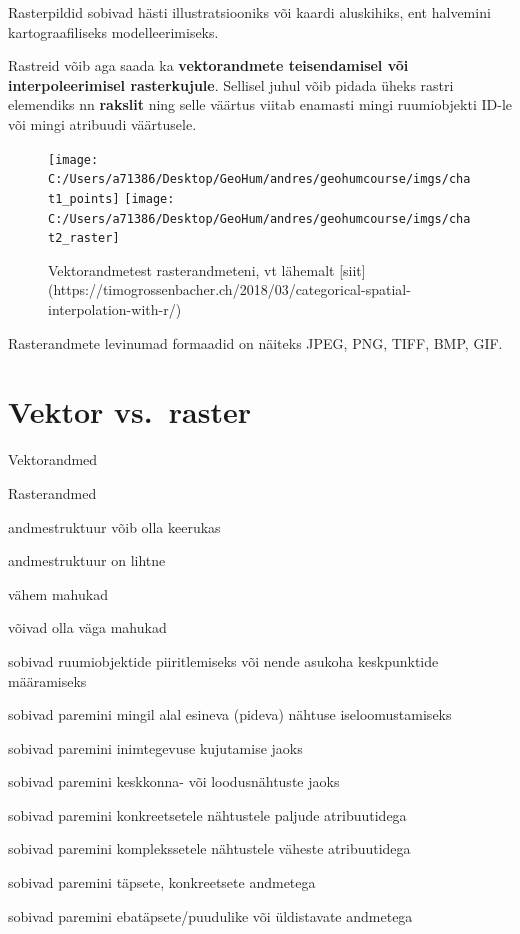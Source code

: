 \documentclass[
]{book}
\begin{document}
Rasterpildid sobivad hästi illustratsiooniks või kaardi aluskihiks, ent halvemini kartograafiliseks modelleerimiseks.

Rastreid võib aga saada ka \textbf{vektorandmete teisendamisel või interpoleerimisel rasterkujule}. Sellisel juhul võib pidada üheks rastri elemendiks nn \textbf{rakslit} ning selle väärtus viitab enamasti mingi ruumiobjekti ID-le või mingi atribuudi väärtusele.

\begin{figure}

{\centering \texttt{[image: C:/Users/a71386/Desktop/GeoHum/andres/geohumcourse/imgs/chat1\_points]} \texttt{[image: C:/Users/a71386/Desktop/GeoHum/andres/geohumcourse/imgs/chat2\_raster]} 

}

\caption{Vektorandmetest rasterandmeteni, vt lähemalt [siit](https://timogrossenbacher.ch/2018/03/categorical-spatial-interpolation-with-r/)}\label{fig:german-dialects}
\end{figure}

Rasterandmete levinumad formaadid on näiteks JPEG, PNG, TIFF, BMP, GIF.

\hypertarget{vektor-vs.-raster}{%
\section{Vektor vs.~raster}\label{vektor-vs.-raster}}

Vektorandmed

Rasterandmed

andmestruktuur võib olla keerukas

andmestruktuur on lihtne

vähem mahukad

võivad olla väga mahukad

sobivad ruumiobjektide piiritlemiseks või nende asukoha keskpunktide määramiseks

sobivad paremini mingil alal esineva (pideva) nähtuse iseloomustamiseks

sobivad paremini inimtegevuse kujutamise jaoks

sobivad paremini keskkonna- või loodusnähtuste jaoks

sobivad paremini konkreetsetele nähtustele paljude atribuutidega

sobivad paremini komplekssetele nähtustele väheste atribuutidega

sobivad paremini täpsete, konkreetsete andmetega

sobivad paremini ebatäpsete/puudulike või üldistavate andmetega
\end{document}
